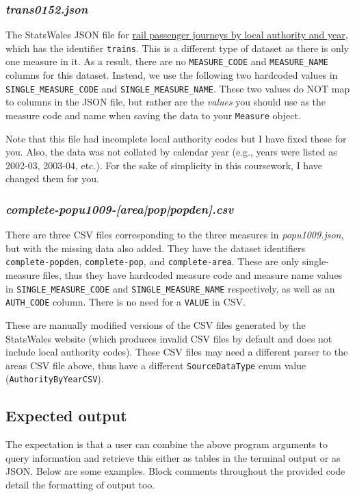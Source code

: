 \documentclass[a4paper]{article}
\begin{document}
\subsubsection*{\emph{trans0152.json}}\label{sec:cwk datasets trans0152}
The StatsWales JSON file for \href{https://statswales.gov.wales/Catalogue/Transport/rail/rail-transport/railpassengerjourneys-by-localauthority-year}{rail passenger journeys by local authority and year}, which has the identifier \texttt{trains}. This is a different type of dataset as there is only one measure in it. As a result, there are no \texttt{MEASURE\_CODE} and \texttt{MEASURE\_NAME} columns for this dataset. Instead, we use the following two hardcoded values in \texttt{SINGLE\_MEASURE\_CODE} and \texttt{SINGLE\_MEASURE\_NAME}. These two values do NOT map to columns in the JSON file, but rather are the \emph{values} you should use as the measure code and name when saving the data to your \texttt{Measure} object.

Note that this file had incomplete local authority codes but I have fixed these for you. Also, the data was not collated by calendar year (e.g., years were listed as 2002-03, 2003-04, etc.). For the sake of simplicity in this coursework, I have changed them for you.


\subsubsection*{\emph{complete-popu1009-[area|pop|popden].csv}}\label{sec:cwk datasets complete-popu1009}
There are three CSV files corresponding to the three measures in \emph{popu1009.json}, but with the missing data also added. They have the dataset identifiers \texttt{complete-popden}, \texttt{complete-pop}, and \texttt{complete-area}. These are only single-measure files, thus they have hardcoded measure code and measure name values in \texttt{SINGLE\_MEASURE\_CODE} and \texttt{SINGLE\_MEASURE\_NAME} respectively, as well as an \texttt{AUTH\_CODE} column. There is no need for a \texttt{VALUE} in CSV.

These are manually modified versions of the CSV files generated by the StatsWales website (which produces invalid CSV files by default and does not include local authority codes). These CSV files may need a different parser to the areas CSV file above, thus have a different \texttt{SourceDataType} enum value (\texttt{AuthorityByYearCSV}).




\subsection*{Expected output}\label{sec:cwk output}
The expectation is that a user can combine the above program arguments to query information and retrieve this either as tables in the terminal output or as JSON. Below are some examples. Block comments throughout the provided code detail the formatting of output too.
\end{document}
